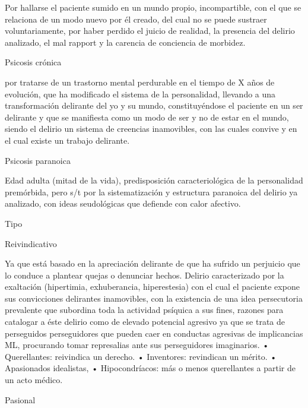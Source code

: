 \documentclass{scrbook}
\begin{document}
Por hallarse el paciente sumido en un mundo propio, incompartible, con el que se relaciona de un modo nuevo por él creado, del cual no se puede sustraer voluntariamente, por haber perdido el juicio de realidad, la presencia del delirio analizado, el mal rapport y la carencia de conciencia de morbidez.

Psicosis crónica

por tratarse de un trastorno mental perdurable en el tiempo de X años de evolución, que ha modificado el sistema de la personalidad, llevando a una transformación delirante del yo y su mundo, constituyéndose el paciente en un ser delirante y que se manifiesta como un modo de ser y no de estar en el mundo, siendo el delirio un sistema de creencias inamovibles, con las cuales convive y en el cual existe un trabajo delirante.

Psicosis paranoica

Edad adulta (mitad de la vida), predisposición caracteriológica de la personalidad premórbida, pero s/t por la sistematización y estructura paranoica del delirio ya analizado, con ideas seudológicas que defiende con calor afectivo.

Tipo

Reivindicativo

Ya que está basado en la apreciación delirante de que ha sufrido un perjuicio que lo conduce a plantear quejas o denunciar hechos. Delirio caracterizado por la exaltación (hipertimia, exhuberancia, hiperestesia) con el cual el paciente expone sus convicciones delirantes inamovibles, con la existencia de una idea persecutoria prevalente que subordina toda la actividad psíquica a sus fines, razones para catalogar a éste delirio como de elevado potencial agresivo ya que se trata de perseguidos perseguidores que pueden caer en conductas agresivas de implicancias ML, procurando tomar represalias ante sus perseguidores imaginarios. • Querellantes: reivindica un derecho. • Inventores: revindican un mérito. • Apasionados idealistas, • Hipocondríacos: más o menos querellantes a partir de un acto médico.

Pasional
\end{document}

